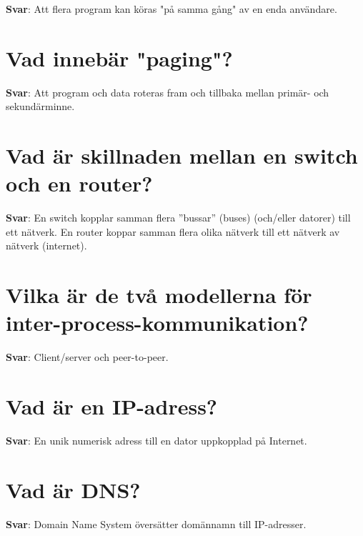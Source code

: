 \documentclass[a4paper,11pt,oneside]{book}
\begin{document}
\begin{sloppypar}
\label{q:132:sa:sv:True}

\textbf{Svar}: Att flera program kan k\"oras "p\r{a} samma g\r{a}ng" av en enda anv\"andare.



\section{Vad inneb\"ar "paging"?}

\label{q:133:sa:sv:True}

\textbf{Svar}: Att program och data roteras fram och tillbaka mellan prim\"ar- och sekund\"arminne.



\section{Vad \"ar skillnaden mellan en switch och en router?}

\label{q:134:sa:sv:True}

\textbf{Svar}: En switch kopplar samman flera {\textquotedblright}bussar{\textquotedblright} (buses) (och/eller datorer) till ett n\"atverk. En router koppar samman flera olika n\"atverk till ett n\"atverk av n\"atverk (internet).



\section{Vilka \"ar de tv\r{a} modellerna f\"or inter-process-kommunikation?}

\label{q:135:sa:sv:True}

\textbf{Svar}: Client/server och peer-to-peer.



\section{Vad \"ar en IP-adress?}

\label{q:136:sa:sv:True}

\textbf{Svar}: En unik numerisk adress till en dator uppkopplad p\r{a} Internet.



\section{Vad \"ar DNS?}

\label{q:137:sa:sv:True}

\textbf{Svar}: Domain Name System \"overs\"atter dom\"annamn till IP-adresser.




\end{sloppypar}
\end{document}
